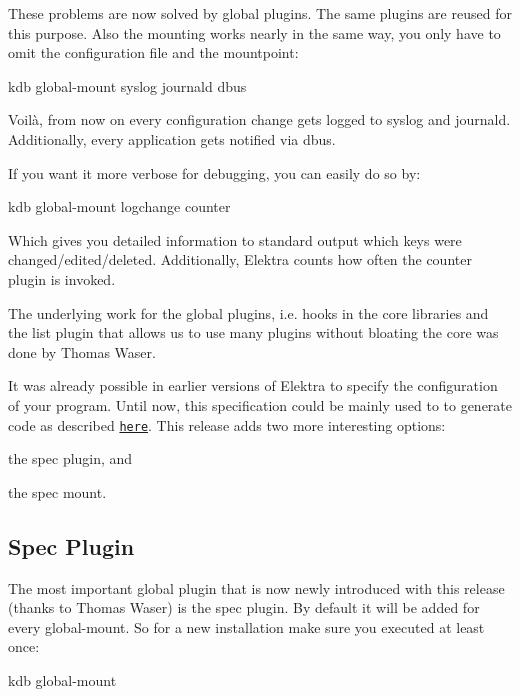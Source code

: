 These problems are now solved by global plugins. The same plugins are reused for this purpose. Also the mounting works nearly in the same way, you only have to omit the configuration file and the mountpoint\+: \begin{DoxyVerb}    kdb global-mount syslog journald dbus
\end{DoxyVerb}


Voilà, from now on every configuration change gets logged to syslog and journald. Additionally, every application gets notified via dbus.

If you want it more verbose for debugging, you can easily do so by\+: \begin{DoxyVerb}    kdb global-mount logchange counter
\end{DoxyVerb}


Which gives you detailed information to standard output which keys were changed/edited/deleted. Additionally, Elektra counts how often the {\ttfamily counter} plugin is invoked.

The underlying work for the global plugins, i.\+e. hooks in the core libraries and the {\ttfamily list} plugin that allows us to use many plugins without bloating the core was done by Thomas Waser.

It was already possible in earlier versions of Elektra to specify the configuration of your program. Until now, this specification could be mainly used to to generate code as described \href{https://github.com/ElektraInitiative/libelektra/tree/master/src/tools/gen}{\tt here}. This release adds two more interesting options\+:


\begin{DoxyEnumerate}
\item the spec plugin, and
\item the spec mount.
\end{DoxyEnumerate}

\subsection*{Spec Plugin}

The most important global plugin that is now newly introduced with this release (thanks to Thomas Waser) is the {\ttfamily spec} plugin. By default it will be added for every global-\/mount. So for a new installation make sure you executed at least once\+: \begin{DoxyVerb}    kdb global-mount
\end{DoxyVerb}



